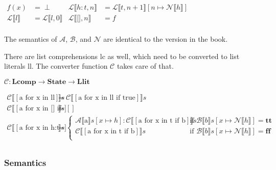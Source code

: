 \documentclass[12pt]{article}
\newcommand{\metavar}[1]{\textlangle#1\textrangle}
\newcommand{\dblbr}[1]{\llbracket#1\rrbracket}
\newcommand{\fancybr}[2]{#1 \dblbr{#2}}
\renewcommand{\AA}{\mathcal{A}}
\newcommand{\BB}{\mathcal{B}}
\newcommand{\CC}{\mathcal{C}}
\newcommand{\LL}{\mathcal{L}}
\newcommand{\NN}{\mathcal{N}}
\newcommand{\State}{\mathbf{State}}
\newcommand{\Llit}{\mathbf{Llit}}
\newcommand{\Lcomp}{\mathbf{Lcomp}}
\begin{document}
$\begin{aligned}
    f(x) &= \perp & \fancybr{\LL}{h:t, n} &= \fancybr{\LL}{t, n + 1}[n \mapsto \fancybr{\NN}{h}]\\
    \fancybr{\LL}{l} &= \fancybr{\LL}{l, 0} & \fancybr{\LL}{\texttt{[]}, n} &= f\\
\end{aligned}$

The semantics of $\AA$, $\BB$, and $\NN$ are identical to the version in the book.

There are list comprehensions \metavar{lc} as well, which need to be converted to list literals \metavar{ll}. The converter function $\CC$ takes care of that.

$\CC: \Lcomp \rightarrow \State \rightarrow \Llit$

$\begin{aligned}
    \fancybr{\CC}{[\text{a for x in ll}]} s &= \fancybr{\CC}{[\text{a for x in ll if true}]} s\\
    \fancybr{\CC}{[\text{a for x in [] if b}]} s &= []\\
    \fancybr{\CC}{[\text{a for x in h:t if b}]} s &= \begin{cases}
        \fancybr{\AA}{\text{a}} s[x \mapsto h] : \fancybr{\CC}{[\text{a for x in t if b}]} s
        & \text{if } \fancybr{\BB}{b} s[x \mapsto \fancybr{\NN}{h}] = \mathbf{tt}\\
        \fancybr{\CC}{[\text{a for x in t if b}]} s
        & \text{if } \fancybr{\BB}{b} s[x \mapsto \fancybr{\NN}{h}] = \mathbf{ff}\\
    \end{cases}\\
\end{aligned}$

\subsubsection{Semantics}
\end{document}
